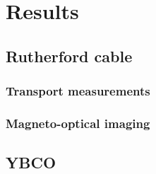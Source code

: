 \documentclass{comjnl}
\begin{document}
\section{Results}\label{Sec:Results}
\subsection{Rutherford cable}
\subsubsection{Transport measurements}
\subsubsection{Magneto-optical imaging}

\subsection{YBCO}
\end{document}

